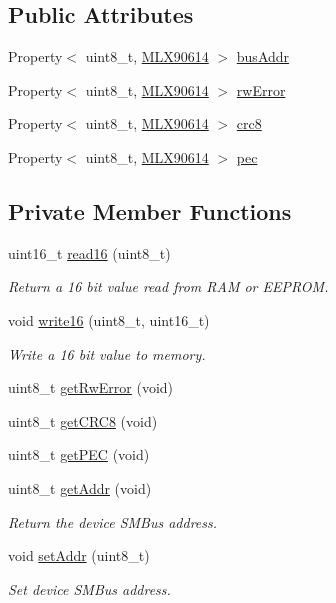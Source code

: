 \subsection*{Public Attributes}
\begin{DoxyCompactItemize}
\item 
Property$<$ uint8\-\_\-t, \hyperlink{class_m_l_x90614}{M\-L\-X90614} $>$ \hyperlink{class_m_l_x90614_a66d99dc5778b514038c0fa5e25a722f1}{bus\-Addr}
\item 
Property$<$ uint8\-\_\-t, \hyperlink{class_m_l_x90614}{M\-L\-X90614} $>$ \hyperlink{class_m_l_x90614_a13d10b57b4369c27e740585bf3907b0e}{rw\-Error}
\item 
Property$<$ uint8\-\_\-t, \hyperlink{class_m_l_x90614}{M\-L\-X90614} $>$ \hyperlink{class_m_l_x90614_aa13abb960da5f7d8d0eb26df8632a679}{crc8}
\item 
Property$<$ uint8\-\_\-t, \hyperlink{class_m_l_x90614}{M\-L\-X90614} $>$ \hyperlink{class_m_l_x90614_af050e02eecd12a127a98fb2b30e40a88}{pec}
\end{DoxyCompactItemize}
\subsection*{Private Member Functions}
\begin{DoxyCompactItemize}
\item 
uint16\-\_\-t \hyperlink{class_m_l_x90614_ad7fb030682918c5c9ae6292962527b44}{read16} (uint8\-\_\-t)
\begin{DoxyCompactList}\small\item\em Return a 16 bit value read from R\-A\-M or E\-E\-P\-R\-O\-M. \end{DoxyCompactList}\item 
void \hyperlink{class_m_l_x90614_a18cf4b5a62e225e8530a1e0f641ea027}{write16} (uint8\-\_\-t, uint16\-\_\-t)
\begin{DoxyCompactList}\small\item\em Write a 16 bit value to memory. \end{DoxyCompactList}\item 
uint8\-\_\-t \hyperlink{class_m_l_x90614_a785e254cb6af386a7f23ebd427b50c81}{get\-Rw\-Error} (void)
\item 
uint8\-\_\-t \hyperlink{class_m_l_x90614_a6635121e11e44f85945d18bb81d85b4f}{get\-C\-R\-C8} (void)
\item 
uint8\-\_\-t \hyperlink{class_m_l_x90614_a7bd321c53f70f4f3a96f7c6c7d4cb80e}{get\-P\-E\-C} (void)
\item 
uint8\-\_\-t \hyperlink{class_m_l_x90614_a7ba22b140f92bea70381cf3c495d4c72}{get\-Addr} (void)
\begin{DoxyCompactList}\small\item\em Return the device S\-M\-Bus address. \end{DoxyCompactList}\item 
void \hyperlink{class_m_l_x90614_a3d8646faede1c0adc667c54a0c95a7db}{set\-Addr} (uint8\-\_\-t)
\begin{DoxyCompactList}\small\item\em Set device S\-M\-Bus address. \end{DoxyCompactList}\end{DoxyCompactItemize}
